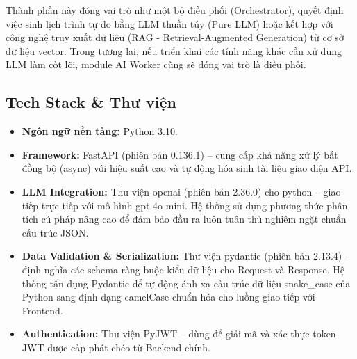 \quad Thành phần này đóng vai trò như một bộ điều phối (Orchestrator), quyết định việc sinh lịch trình tự do bằng LLM thuần túy (Pure LLM) hoặc kết hợp với công nghệ truy xuất dữ liệu (RAG - Retrieval-Augmented Generation) từ cơ sở dữ liệu vector. Trong tương lai, nếu triển khai các tính năng khác cần xử dụng LLM làm cốt lõi, module AI Worker cũng sẽ đóng vai trò là điều phối.

\subsection{Tech Stack \& Thư viện}

\begin{itemize}
    \item \textbf{Ngôn ngữ nền tảng:} Python 3.10.
    \item \textbf{Framework:} FastAPI (phiên bản 0.136.1) \cite{fastapi} – cung cấp khả năng xử lý bất đồng bộ (async) với hiệu suất cao và tự động hóa sinh tài liệu giao diện API.
    \item \textbf{LLM Integration:} Thư viện openai (phiên bản 2.36.0) cho python \cite{openai} – giao tiếp trực tiếp với mô hình gpt-4o-mini. Hệ thống sử dụng phương thức phân tích cú pháp nâng cao để đảm bảo đầu ra luôn tuân thủ nghiêm ngặt chuẩn cấu trúc JSON.
    \item \textbf{Data Validation \& Serialization:} Thư viện pydantic (phiên bản 2.13.4) \cite{pydantic} – định nghĩa các schema ràng buộc kiểu dữ liệu cho Request và Response. Hệ thống tận dụng Pydantic để tự động ánh xạ cấu trúc dữ liệu snake\_case của Python sang định dạng camelCase chuẩn hóa cho luồng giao tiếp với Frontend.
    \item \textbf{Authentication:} Thư viện PyJWT \cite{jwt} – dùng để giải mã và xác thực token JWT được cấp phát chéo từ Backend chính.
\end{itemize}

